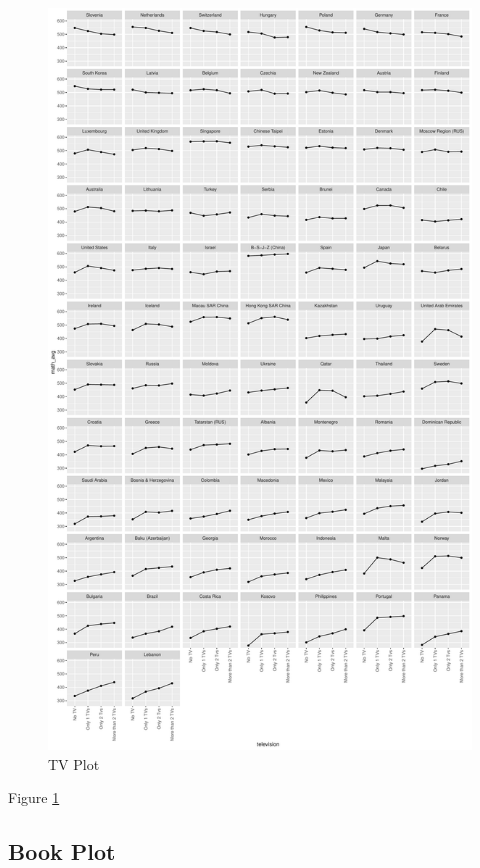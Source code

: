 \begin{Schunk}
\begin{figure}[H]
\includegraphics[width=1\linewidth]{learningtower_files/figure-latex/tv-plot-1} \caption[TV Plot]{TV Plot}\label{fig:tv-plot}
\end{figure}
\end{Schunk}

Figure \ref{fig:tv-plot}

\hypertarget{book-plot}{%
\subsection{Book Plot}\label{book-plot}}

